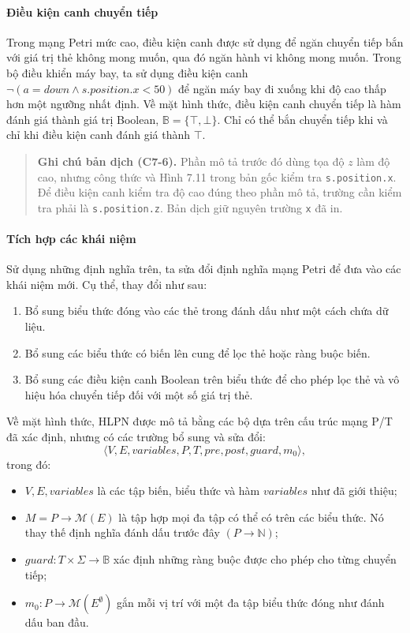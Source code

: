 \paragraph{Điều kiện canh chuyển tiếp}
Trong mạng Petri mức cao, điều kiện canh được sử dụng để ngăn chuyển tiếp bắn với giá trị thẻ không mong muốn, qua đó ngăn hành vi không mong muốn. Trong bộ điều khiển máy bay, ta sử dụng điều kiện canh $\neg(a=down\land s.position.x<50)$ để ngăn máy bay đi xuống khi độ cao thấp hơn một ngưỡng nhất định. Về mặt hình thức, điều kiện canh chuyển tiếp là hàm đánh giá thành giá trị Boolean, $\mathbb{B}=\{\top,\bot\}$. Chỉ có thể bắn chuyển tiếp khi và chỉ khi điều kiện canh đánh giá thành $\top$.
\begin{quote}
\small\textbf{Ghi chú bản dịch (C7-6).} Phần mô tả trước đó dùng tọa độ $z$ làm độ cao, nhưng công thức và Hình 7.11 trong bản gốc kiểm tra \texttt{s.position.x}. Để điều kiện canh kiểm tra độ cao đúng theo phần mô tả, trường cần kiểm tra phải là \texttt{s.position.z}. Bản dịch giữ nguyên trường \texttt{x} đã in.
\end{quote}


\paragraph{Tích hợp các khái niệm}
Sử dụng những định nghĩa trên, ta sửa đổi định nghĩa mạng Petri để đưa vào các khái niệm mới. Cụ thể, thay đổi như sau:
\begin{enumerate}
\item Bổ sung biểu thức đóng vào các thẻ trong đánh dấu như một cách chứa dữ liệu.
\item Bổ sung các biểu thức có biến lên cung để lọc thẻ hoặc ràng buộc biến.
\item Bổ sung các điều kiện canh Boolean trên biểu thức để cho phép lọc thẻ và vô hiệu hóa chuyển tiếp đối với một số giá trị thẻ.
\end{enumerate}

Về mặt hình thức, HLPN được mô tả bằng các bộ dựa trên cấu trúc mạng P/T đã xác định, nhưng có các trường bổ sung và sửa đổi:
\[
\langle V,E,variables,P,T,pre,post,guard,m_0\rangle,
\]
trong đó:
\begin{itemize}
\item $V,E,variables$ là các tập biến, biểu thức và hàm $variables$ như đã giới thiệu;
\item $M=P\to\mathcal{M}(E)$ là tập hợp mọi đa tập có thể có trên các biểu thức. Nó thay thế định nghĩa đánh dấu trước đây $(P\to\mathbb{N})$;
\item $guard:T\times\Sigma\to\mathbb{B}$ xác định những ràng buộc được cho phép cho từng chuyển tiếp;
\item $m_0:P\to\mathcal{M}(E^{\emptyset})$ gắn mỗi vị trí với một đa tập biểu thức đóng như đánh dấu ban đầu.
\end{itemize}


